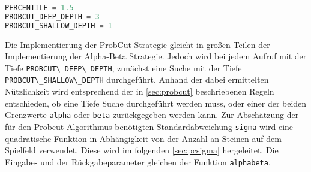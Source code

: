 \begin{lstlisting}[language=Python]
PERCENTILE = 1.5
PROBCUT_DEEP_DEPTH = 3
PROBCUT_SHALLOW_DEPTH = 1
\end{lstlisting}

Die Implementierung der ProbCut Strategie gleicht in großen Teilen der
Implementierung der Alpha-Beta Strategie. Jedoch wird bei jedem Aufruf
mit der Tiefe \passthrough{\lstinline!PROBCUT\_DEEP\_DEPTH!}, zunächst
eine Suche mit der Tiefe
\passthrough{\lstinline!PROBCUT\_SHALLOW\_DEPTH!} durchgeführt. Anhand
der dabei ermittelten Nützlichkeit wird entsprechend der in
\autoref{sec:probcut} beschriebenen Regeln entschieden, ob eine Tiefe
Suche durchgeführt werden muss, oder einer der beiden Grenzwerte
\passthrough{\lstinline!alpha!} oder \passthrough{\lstinline!beta!}
zurückgegeben werden kann. Zur Abschätzung der für den Probcut
Algorithmus benötigten Standardabweichung
\passthrough{\lstinline!sigma!} wird eine quadratische Funktion in
Abhängigkeit von der Anzahl an Steinen auf dem Spielfeld verwendet.
Diese wird im folgenden \autoref{sec:pcsigma} hergeleitet. Die Eingabe-
und der Rückgabeparameter gleichen der Funktion
\passthrough{\lstinline!alphabeta!}.

